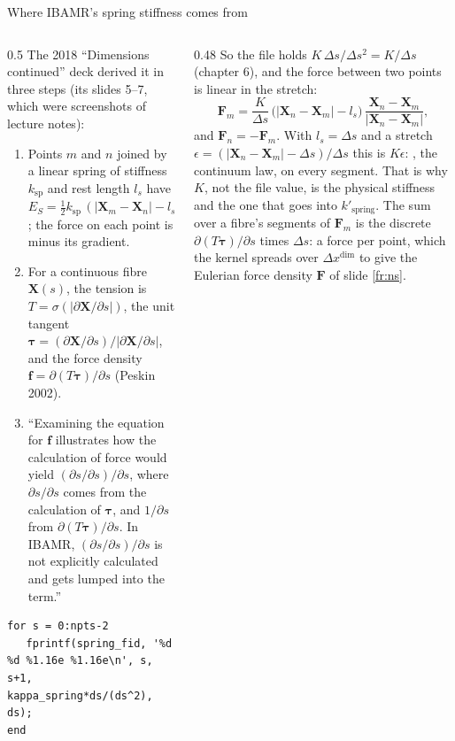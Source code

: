 \documentclass[aspectratio=169,11pt]{beamer}
\begin{document}
\begin{frame}[fragile]{Where IBAMR's spring stiffness comes from}
\label{fr:springlaw}
\begin{columns}[T,onlytextwidth]
\begin{column}{0.5\textwidth}
\scriptsize The 2018 ``Dimensions continued'' deck derived it in three steps (its slides 5--7, which were screenshots of lecture notes):
\begin{enumerate}
  \item {} Points $m$ and $n$ joined by a linear spring of stiffness $k_{\mathrm{sp}}$ and rest length $l_s$ have $E_S = \tfrac12 k_{\mathrm{sp}}\,(|\mathbf{X}_m - \mathbf{X}_n| - l_s)^2$; the force on each point is minus its gradient.
  \item {} For a continuous fibre $\mathbf{X}(s)$, the tension is $T = \sigma(|\partial\mathbf{X}/\partial s|)$, the unit tangent $\boldsymbol{\tau} = (\partial\mathbf{X}/\partial s)/|\partial\mathbf{X}/\partial s|$, and the force density $\mathbf{f} = \partial(T\boldsymbol{\tau})/\partial s$ (Peskin 2002).
  \item {} ``Examining the equation for $\mathbf{f}$ illustrates how the calculation of force would yield $(\partial s/\partial s)/\partial s$, where $\partial s/\partial s$ comes from the calculation of $\boldsymbol{\tau}$, and $1/\partial s$ from $\partial(T\boldsymbol{\tau})/\partial s$. In IBAMR, $(\partial s/\partial s)/\partial s$ is not explicitly calculated and gets lumped into the  term.''
\end{enumerate}
\begin{lstlisting}[style=matlabtiny]
for s = 0:npts-2
   fprintf(spring_fid, '%d %d %1.16e %1.16e\n', s, s+1, kappa_spring*ds/(ds^2), ds);
end
\end{lstlisting}
\end{column}
\begin{column}{0.48\textwidth}
\scriptsize So the file holds $K\,\Delta s/\Delta s^2 = K/\Delta s$ (chapter 6), and the force between two points is linear in the stretch:
\[
  \mathbf{F}_{m} = \frac{K}{\Delta s}\,\bigl(|\mathbf{X}_n - \mathbf{X}_m| - l_s\bigr)\,\frac{\mathbf{X}_n - \mathbf{X}_m}{|\mathbf{X}_n - \mathbf{X}_m|},
\]
and $\mathbf{F}_n = -\mathbf{F}_m$.
With $l_s = \Delta s$ and a stretch $\epsilon = (|\mathbf{X}_n - \mathbf{X}_m| - \Delta s)/\Delta s$ this is $K\epsilon$: , the continuum law, on every segment. That is why $K$, not the file value, is the physical stiffness and the one that goes into $k'_{\mathrm{spring}}$.
\scriptsize The sum over a fibre's segments of $\mathbf{F}_m$ is the discrete $\partial(T\boldsymbol{\tau})/\partial s$ times $\Delta s$: a force per point, which the kernel spreads over $\Delta x^{\mathrm{dim}}$ to give the Eulerian force density $\mathbf{F}$ of slide \ref{fr:ns}.
\end{column}
\end{columns}
\end{frame}
\end{document}
